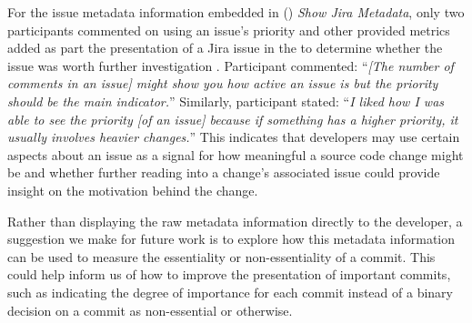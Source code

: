 For the issue metadata information embedded in () \textit{Show Jira Metadata},
only two participants commented on using an issue's priority and other provided metrics added as part  the presentation
of a Jira issue in the  to determine whether the issue was worth further investigation .
Participant  commented:
``\textit{[The number of comments in an issue] might show you how active an issue is but the priority should be the main indicator.}''
Similarly, participant  stated: 
``\textit{I liked how I was able to see the priority [of an issue] because if something has a higher priority, it usually involves heavier changes.}''
This indicates that developers may use certain aspects about an issue as a signal 
for how meaningful a source code change might be and whether further reading into a change's associated issue
could provide insight on the motivation behind the change.

Rather than displaying the raw metadata information directly to the developer,
a suggestion we make for future work is to explore how this metadata information
can be used to measure the essentiality or non-essentiality of a commit.
This could help inform us of how to improve the presentation of important
commits, such as indicating the degree of importance for each commit 
instead of a binary decision on a commit as non-essential or otherwise.

\endinput

Any text after an \endinput is ignored.
You could put scraps here or things in progress.